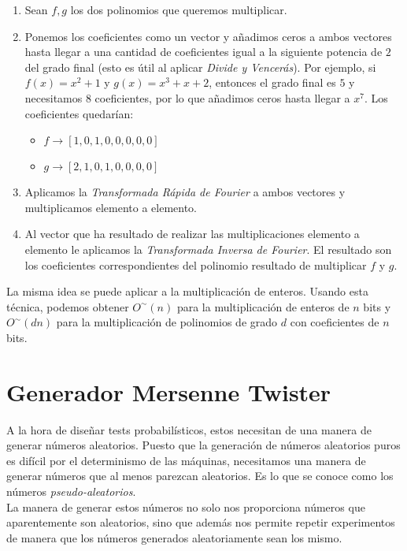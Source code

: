 \begin{enumerate}
	\item Sean $f, g$ los dos polinomios que queremos multiplicar.
	
	\item Ponemos los coeficientes como un vector y añadimos ceros a ambos vectores hasta llegar a una cantidad de coeficientes igual a la siguiente potencia de $2$ del grado final (esto es útil al aplicar \textit{Divide y Vencerás}). Por ejemplo, si $f(x) = x^2 + 1$ y $g(x) = x^3 + x + 2$, entonces el grado final es $5$ y necesitamos 8 coeficientes, por lo que añadimos ceros hasta llegar a $x^7$. Los coeficientes quedarían:
	
	\begin{itemize}
		\item $f\rightarrow[1, 0, 1, 0, 0, 0, 0, 0]$
		\item $g\rightarrow[2, 1, 0, 1, 0, 0, 0, 0]$
	\end{itemize}
	
	\item Aplicamos la \textit{Transformada Rápida de Fourier} a ambos vectores y multiplicamos elemento a elemento.
	
	\item Al vector que ha resultado de realizar las multiplicaciones elemento a elemento le aplicamos la \textit{Transformada Inversa de Fourier}. El resultado son los coeficientes correspondientes del polinomio resultado de multiplicar $f$ y $g$.
\end{enumerate}

La misma idea se puede aplicar a la multiplicación de enteros. Usando esta técnica, podemos obtener $O^\sim(n)$ para la multiplicación de enteros de $n$ bits y $O^\sim(dn)$ para la multiplicación de polinomios de grado $d$ con coeficientes de $n$ bits.

\section{Generador Mersenne Twister}

A la hora de diseñar tests probabilísticos, estos necesitan de una manera de generar números aleatorios. Puesto que la generación de números aleatorios puros es difícil por el determinismo de las máquinas, necesitamos una manera de generar números que al menos parezcan aleatorios. Es lo que se conoce como los números \textit{pseudo-aleatorios}.\\

La manera de generar estos números no solo nos proporciona números que aparentemente son aleatorios, sino que además nos permite repetir experimentos de manera que los números generados aleatoriamente sean los mismo.\\

